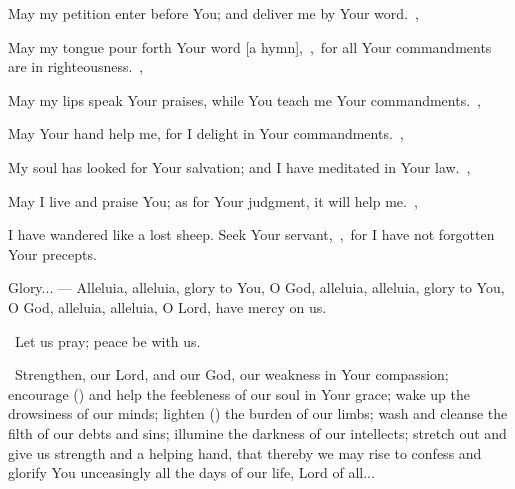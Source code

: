 \documentclass[12pt,twoside,a5paper]{article}
\begin{document}
\begin{halfparskip}
  May my petition enter before You; and deliver me by Your word.~\sep

  May my tongue pour forth Your word [a hymn],~\sep\ for all Your commandments are in righteousness.~\sep

  May my lips speak Your praises, while You teach me Your commandments.~\sep

  May Your hand help me, for I delight in Your commandments.~\sep

  My soul has looked for Your salvation; and I have meditated in Your law.~\sep

  May I live and praise You; as for Your judgment, it will help me.~\sep

  I have wandered like a lost sheep. Seek Your servant,~\sep\ for I have not forgotten Your precepts.

  Glory... --- Alleluia, alleluia, glory to You, O God, alleluia, alleluia, glory to You, O God, alleluia, alleluia, O Lord, have mercy on us.
\end{halfparskip}

\dd~Let us pray; peace be with us.

\cc~Strengthen, our Lord, and our God, our weakness in Your compassion; encourage () and help the feebleness of our soul in Your grace; wake up the drowsiness of our minds; lighten () the burden of our limbs; wash and cleanse the filth of our debts and sins; illumine the darkness of our intellects; stretch out and give us strength and a helping hand, that thereby we may rise to confess and glorify You unceasingly all the days of our life, Lord of all...


\end{document}
